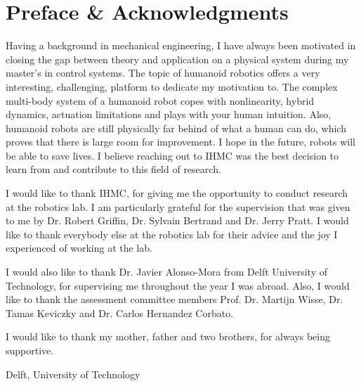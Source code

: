 %
\chapter{Preface \& Acknowledgments}%
Having a background in mechanical engineering, I have always been motivated in closing the gap between theory and application on a physical system during my master's in control systems. The topic of humanoid robotics offers a very interesting, challenging, platform to dedicate my motivation to. The complex multi-body system of a humanoid robot copes with nonlinearity, hybrid dynamics, actuation limitations and plays with your human intuition. Also, humanoid robots are still physically far behind of what a human can do, which proves that there is large room for improvement. I hope in the future, robots will be able to save lives. I believe reaching out to \ac{IHMC} was the best decision to learn from and contribute to this field of research.

I would like to thank \ac{IHMC}, for giving me the opportunity to conduct research at the robotics lab. I am particularly grateful for the supervision that was given to me by Dr. Robert Griffin, Dr. Sylvain Bertrand and Dr. Jerry Pratt. I would like to thank everybody else at the robotics lab for their advice and the joy I experienced of working at the lab. 

I would also like to thank Dr. Javier Alonso-Mora from Delft University of Technology, for supervising me throughout the year I was abroad. Also, I would like to thank the assessment committee members Prof. Dr. Martijn Wisse, Dr. Tamas Keviczky and Dr. Carlos Hernandez Corbato.

I would like to thank my mother, father and two brothers, for always being supportive.

\vspace*{15mm}

Delft, University of Technology \hfill \mscname \\
\mscdate